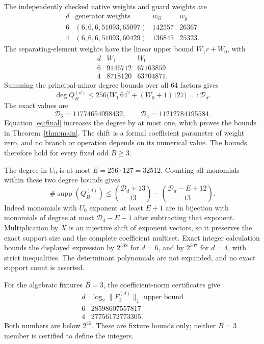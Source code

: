 \documentclass[11pt,a4paper]{article}
\begin{document}
The independently checked native weights and guard weights are
\[
\begin{array}{c|c|r|r}
 d&\text{generator weights}&w_G&w_g\\\hline
 6&(6,6,6,51093,65097)&142557&26367\\
 4&(6,6,6,51093,60429)&136845&25323.
\end{array}
\]
The separating-element weights have the linear upper bound
$W_1r+W_0$, with
\[
\begin{array}{c|r|r}
 d&W_1&W_0\\\hline
 6&9146712&67163859\\
 4&8718120&63704871.
\end{array}
\]
Summing the principal-minor degree bounds over all 64 factors gives
\[
 \deg Q_B^{(d)}\le256\bigl(W_1\,64^2+(W_0+1)127\bigr)=:\mathcal D_d.
\]
The exact values are
\[
             \mathcal D_6=11774654098432,\qquad
             \mathcal D_4=11212784195584.
\]
Equation \eqref{eq:final} increases the degree by at most one,
which proves the bounds in Theorem~\ref{thm:main}.
The shift is a formal coefficient parameter of weight zero, and
no branch or operation depends on its numerical value. The bounds
therefore hold for every fixed odd $B\ge3$.

The degree in $U_0$ is at most $E=256\cdot127=32512$.
Counting all monomials within these two degree bounds gives
\[
 \#\operatorname{supp}(Q_B^{(d)})
 \le \binom{\mathcal D_d+13}{13}
                    -\binom{\mathcal D_d-E+12}{13}.
\]
Indeed monomials with $U_0$ exponent at least $E+1$ are in
bijection with monomials of degree at most $\mathcal D_d-E-1$
after subtracting that exponent. Multiplication by $X$ is an
injective shift of exponent vectors, so it preserves the exact
support size and the complete coefficient multiset. Exact integer
calculation bounds the displayed expression by $2^{508}$ for
$d=6$, and by $2^{507}$ for $d=4$, with strict inequalities.
The determinant polynomials are not expanded, and no exact support
count is asserted.

For the algebraic fixtures $B=3$, the coefficient-norm certificates give
\[
\begin{array}{c|r}
 d&\log_2\|F_3^{(d)}\|_1\text{ upper bound}\\\hline
 6&28598607557817\\
 4&27756172773305.
\end{array}
\]
Both numbers are below $2^{45}$. These are fixture bounds only;
neither $B=3$ member is certified to define the integers.
\end{document}
